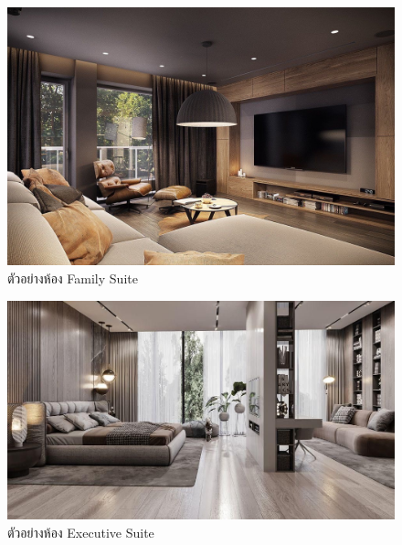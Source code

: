 \documentclass{report}
\begin{document}
\begin{figure}
    \centering
    \includegraphics[scale=0.2]{Family.jpg}
    \caption{ตัวอย่างห้อง Family Suite}
    \label{fig:graph4}
\end{figure}

\begin{figure}
    \centering
    \includegraphics[scale=0.2]{Executive.jpg}
    \caption{ตัวอย่างห้อง Executive Suite}
    \label{fig:graph5}
\end{figure}
\end{document}
